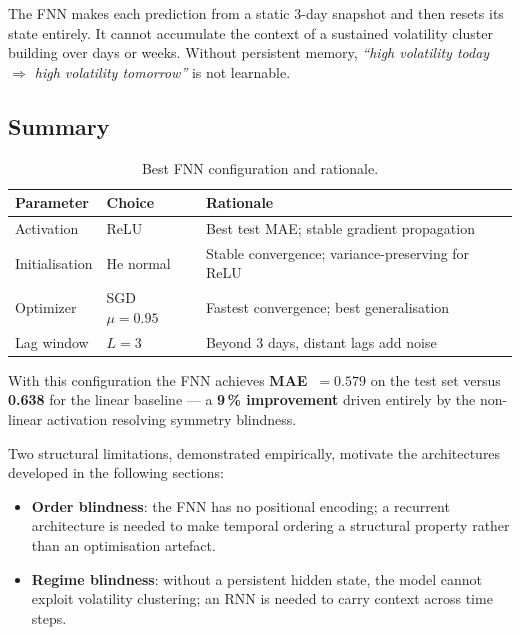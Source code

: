 The FNN makes each prediction from a static 3-day snapshot and then resets its
state entirely. It cannot accumulate the context of a sustained volatility
cluster building over days or weeks. Without persistent memory,
\emph{``high volatility today $\Rightarrow$ high volatility tomorrow''}
is not learnable.

\subsection{Summary}

\begin{table}[H]
  \centering
  \caption{Best FNN configuration and rationale.}
  \label{tab:fnn_best}
  \begin{tabular}{lll}
    \toprule
    Parameter & Choice & Rationale \\
    \midrule
    Activation    & ReLU              & Best test MAE; stable gradient propagation \\
    Initialisation & He normal        & Stable convergence; variance-preserving for ReLU \\
    Optimizer     & SGD $\mu=0.95$    & Fastest convergence; best generalisation \\
    Lag window    & $L=3$             & Beyond 3 days, distant lags add noise \\
    \bottomrule
  \end{tabular}
\end{table}

With this configuration the FNN achieves \textbf{MAE~$=0.579$} on the test set
versus \textbf{0.638} for the linear baseline --- a \textbf{9\,\% improvement}
driven entirely by the non-linear activation resolving symmetry blindness.

Two structural limitations, demonstrated empirically, motivate the architectures
developed in the following sections:
\begin{itemize}
  \item \textbf{Order blindness}: the FNN has no positional encoding; a
        recurrent architecture is needed to make temporal ordering a structural
        property rather than an optimisation artefact.
  \item \textbf{Regime blindness}: without a persistent hidden state, the model
        cannot exploit volatility clustering; an RNN is needed to carry
        context across time steps.
\end{itemize}
